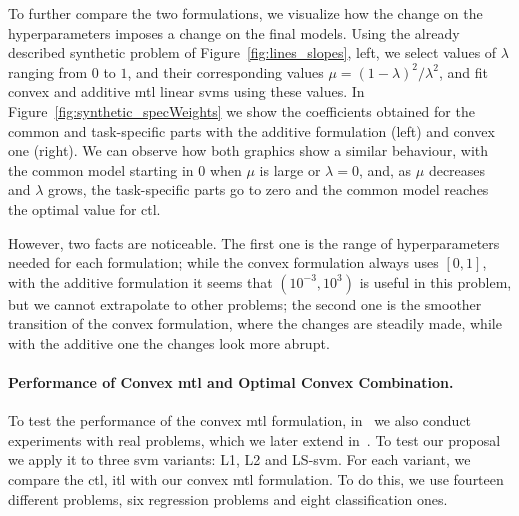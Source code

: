 %
To further compare the two formulations, we visualize how the change on the hyperparameters imposes a change on the final models. Using the already described synthetic problem of Figure~\ref{fig:lines_slopes}, left, we select values of $\lambda$ ranging from $0$ to $1$, and their corresponding values $\mu = (1-\lambda)^2 / \lambda^2$, and fit convex and additive \acrshort{mtl} linear \acrshort{svm}s using these values. In Figure~\ref{fig:synthetic_specWeights} we show the coefficients obtained for the common and task-specific parts with the additive formulation (left) and convex one (right).
%
We can observe how both graphics show a similar behaviour, with the common model starting in $0$ when $\mu$ is large or $\lambda=0$, and, as $\mu$ decreases and $\lambda$ grows, the task-specific parts go to zero and the common model reaches the optimal value for \acrshort{ctl}.
%

However, two facts are noticeable. The first one is the range of hyperparameters needed for each formulation; while the convex formulation always uses $[0, 1]$, with the additive formulation it seems that $(10^{-3}, 10^3)$ is useful in this problem, but we cannot extrapolate to other problems; the second one is the smoother transition of the convex formulation, where the changes are steadily made, while with the additive one the changes look more abrupt.



\paragraph*{Performance of Convex \acrshort{mtl} and Optimal Convex Combination.\\}

To test the performance of the convex \acrshort{mtl} formulation, in~\citep{RuizAD19} we also conduct experiments with real problems, which we later extend in~\citep{RuizAD21}. 
To test our proposal we apply it to three \acrshort{svm} variants: L1, L2 and LS-\acrshort{svm}. For each variant, we compare the \acrshort{ctl}, \acrshort{itl} with our convex \acrshort{mtl} formulation. To do this, we use fourteen different problems, six regression problems and eight classification ones.

